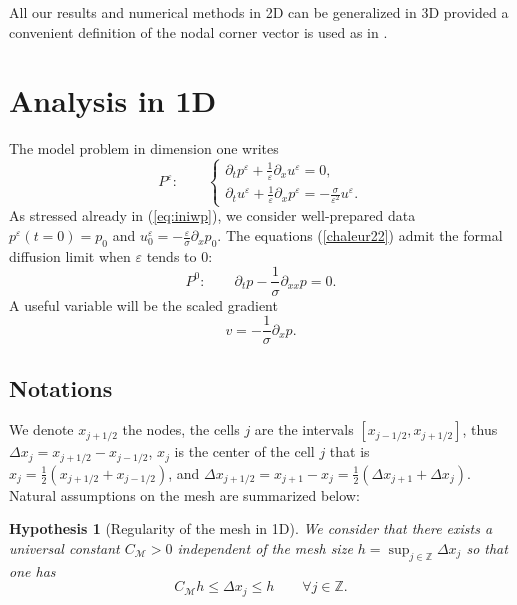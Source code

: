 \documentclass[a4paper,french,english,10pt]{article}
\newcommand\eps{\varepsilon}
\newcommand{\dx}{\partial_x}
\newcommand{\dt}{\partial_t}
\newtheorem{hyp}[theorem]{Hypothesis}
\begin{document}
All our results and numerical methods in 2D can be generalized in 3D 
provided a convenient definition of the nodal corner vector is used as in \cite{de10}.
 
\section{Analysis in 1D} \label{sec:2}



The model problem in dimension one writes
\begin{equation}\label{chaleur22}
P^\varepsilon: \qquad
 \left \{
\begin{array}{lll}
\partial_t p^{\eps} + \frac{1}{\eps}\partial_x u^{\eps} =0, \\
\partial_t u^{\eps} + \frac{1}{\eps}\partial_x p^{\eps} =
-\frac{\sigma}{\eps^2}u^{\eps}.
\end{array}
\right.
\end{equation}
As stressed already in (\ref{eq:iniwp}), we consider well-prepared data
$
p^\varepsilon(t=0)=p_0 $  and  $u_0^\varepsilon=-\frac\varepsilon \sigma \partial_{x}p_0$.
The equations (\ref{chaleur22}) 
admit the formal diffusion limit when $\eps$ tends to $0$:
\begin{equation}\label{difffff}
P^0: \qquad 
\dt p -\frac{1}{\sigma}\partial_{xx}p=0.
\end{equation}
A useful variable will be  the scaled gradient  
\begin{equation} \label{eq:diff-v}
v=-\frac{1}{\sigma}\dx p.
\end{equation}

\subsection{Notations}
We denote $x_{j+1/2}$ the nodes, the cells $j$ are the intervals $[x_{j-1/2},x_{j+1/2}]$, thus $\Delta x_j=x_{j+1/2}-x_{j-1/2}$, $x_j$ is the center of the cell $j$ that is $x_j =\frac12(x_{j+1/2}+x_{j-1/2})$, and $\Delta x_{j+1/2}=x_{j+1}-x_j=\frac12(\Delta x_{j+1}+\Delta x_{j})$. Natural assumptions on the mesh are summarized below:

\begin{hyp}[Regularity of the mesh in 1D] \label{geometrie1d}
 We consider that there exists 
a universal constant $C_{\mathcal{M}}>0$ independent of the mesh size
$h=\sup_{j\in \mathbb Z} \Delta x_j $
so that one has 
$$
C_{\mathcal{M}} h \leq \Delta x_j \leq h \qquad \forall j \in \mathbb{Z}.
$$
\end{hyp}
\end{document}
